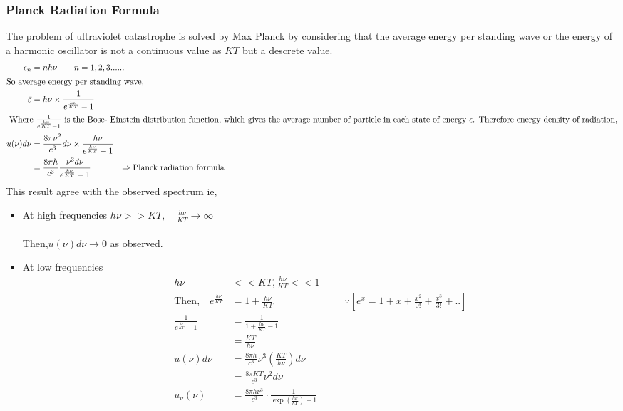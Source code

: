   \subsubsection{Planck Radiation Formula}
  The problem of ultraviolet catastrophe is solved by Max Planck by considering that the average energy per standing wave or the energy of a harmonic oscillator is not a continuous value as $KT$ but a descrete value.
  \begin{align*}
  \epsilon_{n}&=n h \nu \qquad n=1,2,3......\\
  \intertext{So average energy per standing wave,}\quad\bar{\varepsilon}&=h \nu \times \frac{1}{e^\frac{h\nu}{KT}-1}\\
  \intertext{ Where $\frac{1}{e^{\frac{h \nu}{KT}}-1}$  is the Bose- Einstein distribution function, which gives the average number of particle in each state of energy $\epsilon$. Therefore energy density of radiation,}
  u(\nu) d \nu&=\frac{8 \pi \nu^{2}}{c^{3}} d \nu \times \frac{h \nu}{e^{\frac{h\nu}{KT}}-1}\\
  &=\frac{8 \pi h}{c^{3}} \frac{\nu^{3} d \nu}{e^{\frac{h\nu}{KT}}-1} \qquad \hspace{0.5cm}\Rightarrow\text{Planck radiation formula}
  \end{align*}
  This result agree with the observed spectrum ie,
  \begin{itemize}
  	\item At high frequencies \quad $h\nu>>KT,\quad\frac{h\nu}{KT} \rightarrow\infty$\\\\ Then,\quad $u(\nu) d \nu \rightarrow 0$ \quad  as observed. 
  	\item At low frequencies
  	\begin{align*}
  	h\nu&<<KT,\frac{h\nu}{KT}<<1\\
  	\text{Then,}\quad e^\frac{h\nu}{KT}&=1+\frac{h\nu}{KT}\hspace{3cm}\because\left[ e^x=1+x+\frac{x^2}{0!}+\frac{x^3}{3!}+.. \right]\\
  	\frac{1}{e^\frac{h\nu}{KT}-1}&=\frac{1}{1+\frac{h\nu}{KT}-1}\\&=\frac{KT}{h\nu}\\
  	u(\nu) d \nu&=\frac{8 \pi h}{c^{3}} \nu^{3}\left(\frac{KT}{h\nu}\right) d \nu\\&=\frac{8 \pi KT }{c^3} \nu^{2} d \nu\\
  	u_{\nu}(\nu)&=\frac{8 \pi h \nu^{3}}{c^{3}} \cdot \frac{1}{\exp \left(\frac{h \nu}{k T}\right)-1}
  	\end{align*}
  	
  \end{itemize}
